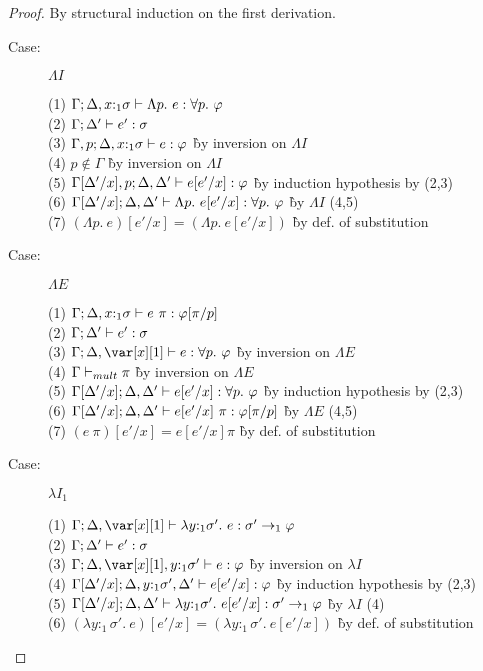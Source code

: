 \begin{proof}
By structural induction on the first derivation.

\begin{description}

\item[Case:] $\Lambda I$
\begin{tabbing}
  (1) $\Gamma; \Delta, x{:}_1\sigma \vdash \Lambda p.~e : \forall p.~\varphi$\\
  (2) $\Gamma; \Delta' \vdash e' : \sigma$\\
  (3) $\Gamma, p; \Delta,x{:}_1\sigma \vdash e : \varphi$ \` by inversion on $\Lambda I$\\
  (4) $p \notin \Gamma$ \` by inversion on $\Lambda I$\\
  (5) $\Gamma[\Delta'/x],p; \Delta,\Delta' \vdash e[e'/x] : \varphi$ \` by induction hypothesis by (2,3)\\
  (6) $\Gamma[\Delta'/x];\Delta,\Delta' \vdash \Lambda p.~e[e'/x] : \forall p.~\varphi$ \` by $\Lambda I$ (4,5)\\
  (7) $(\Lambda p.~e)[e'/x] = (\Lambda p.~e[e'/x])$ \` by def. of substitution\\
\end{tabbing}

\item[Case:] $\Lambda E$
\begin{tabbing}
  (1) $\Gamma; \Delta, x{:}_1\sigma \vdash e~\pi: \varphi[\pi/p]$\\
  (2) $\Gamma; \Delta' \vdash e' : \sigma$\\
  (3) $\G; \D, \xl \vdash e : \forall p.~\varphi$ \` by inversion on $\Lambda E$\\
  (4) $\Gamma \vdash_{mult} \pi$ \` by inversion on $\Lambda E$\\
  (5) $\Gamma[\Delta'/x]; \Delta,\Delta' \vdash e[e'/x] : \forall p.~\varphi$ \` by induction hypothesis by (2,3)\\
  (6) $\Gamma[\Delta'/x]; \Delta,\Delta' \vdash e[e'/x]~\pi : \varphi[\pi/p]$ \` by $\Lambda E$ (4,5)\\
  (7) $(e~\pi)[e'/x] = e[e'/x] \pi$ \` by def. of substitution\\
\end{tabbing}

\item[Case:] $\lambda I_1$
\begin{tabbing}
  (1) $\G; \D, \xl \vdash \lambda y{:}_1\sigma'.~e : \sigma' \to_1 \varphi$\\
  (2) $\Gamma; \Delta' \vdash e' : \sigma$\\
  (3) $\G; \D, \xl, y{:}_1\sigma' \vdash e : \varphi$ \` by inversion on $\lambda I$\\
  (4) $\Gamma[\Delta'/x]; \Delta, y{:}_1\sigma', \Delta' \vdash e[e'/x] : \varphi$ \` by induction hypothesis by (2,3)\\
  (5) $\Gamma[\Delta'/x]; \Delta,\Delta' \vdash \lambda y{:}_1\sigma'.~e[e'/x] : \sigma' \to_1 \varphi$ \` by $\lambda I$ (4)\\
  (6) $(\lambda y{:}_1\sigma'.~e)[e'/x] = (\lambda y{:}_1\sigma'.~e[e'/x])$ \` by def. of substitution\\
\end{tabbing}


\end{description}
\end{proof}
